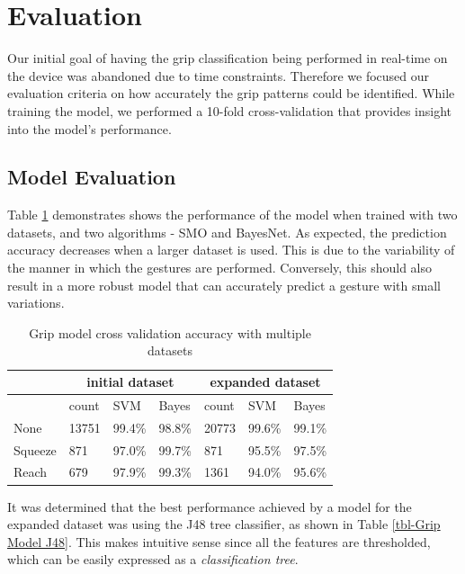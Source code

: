 \section{Evaluation}
Our initial goal of having the grip classification being performed in real-time on the device was abandoned due to time constraints. Therefore we focused our evaluation criteria on how accurately the grip patterns could be identified. While training the model, we performed a 10-fold cross-validation that provides insight into the model's performance. 

\subsection{Model Evaluation}
Table \ref{tbl-Grip Model Eval} demonstrates shows the performance of the model when trained with two datasets, and two algorithms - SMO and BayesNet. As expected, the prediction accuracy decreases when a larger dataset is used. This is due to the variability of the manner in which the gestures are performed. Conversely, this should also result in a more robust model that can accurately predict a gesture with small variations. 

\begin{table}[!t]
\caption{Grip model cross validation accuracy with multiple datasets}
\label{tbl-Grip Model Eval}
\begin{tabular}{lllllll}
\hline
        & \multicolumn{3}{c}{initial dataset} & \multicolumn{3}{c}{expanded dataset} \\ \hline \hline
        & count     & SVM        & Bayes      & count     & SVM        & Bayes    \\ \hline
None    & 13751     & 99.4\%     & 98.8\%     & 20773     & 99.6\%     & 99.1\%      \\ \hline
Squeeze & 871       & 97.0\%     & 99.7\%     & 871       & 95.5\%     & 97.5\%      \\ \hline
Reach   & 679       & 97.9\%     & 99.3\%     & 1361      & 94.0\%     & 95.6\%    \\ \hline
\end{tabular}
\end{table}

It was determined that the best performance achieved by a model for the expanded dataset was using the J48 tree classifier, as shown in  Table \ref{tbl-Grip Model J48}. This makes intuitive sense since all the features are thresholded, which can be easily expressed as a \textit{classification tree}.

